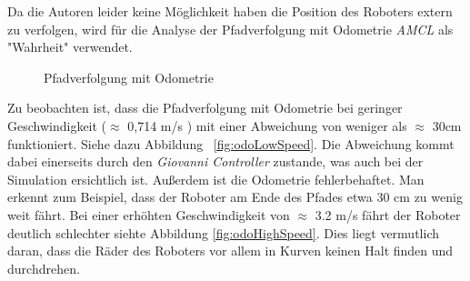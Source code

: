 \documentclass[11pt,a4paper]{article}
\begin{document}
{Da die Autoren leider keine M\"oglichkeit haben die Position des Roboters extern zu verfolgen, wird f\"ur die Analyse der Pfadverfolgung mit Odometrie \textit{AMCL} als "Wahrheit" verwendet.
\newpage
\begin{figure}
	\centering
	\caption{Pfadverfolgung mit Odometrie}
\end{figure}

Zu beobachten ist, dass die Pfadverfolgung mit Odometrie bei geringer Geschwindigkeit ($\approx$ 0,714 m/s ) mit einer Abweichung von weniger als $\approx$ 30cm funktioniert. Siehe dazu Abbildung ~\ref{fig:odoLowSpeed}. Die Abweichung kommt dabei einerseits durch den \textit{Giovanni Controller} zustande, was auch bei der Simulation ersichtlich ist. Außerdem ist die Odometrie fehlerbehaftet. Man erkennt zum Beispiel, dass der Roboter am Ende des Pfades etwa 30 cm zu wenig weit f\"ahrt.
Bei einer erh\"ohten Geschwindigkeit von $\approx$ 3.2 m/s f\"ahrt der Roboter deutlich schlechter siehte Abbildung \ref{fig:odoHighSpeed}. Dies liegt vermutlich daran, dass die R\"ader des Roboters vor allem in Kurven keinen Halt finden und durchdrehen.   

\newpage  

}
\end{document}
